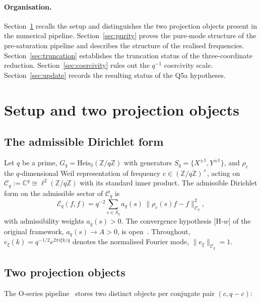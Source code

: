\documentclass[11pt,a4paper]{article}
\theoremstyle{plain}
\theoremstyle{definition}
\newcommand{\Z}{\mathbb{Z}}
\newcommand{\C}{\mathbb{C}}
\newcommand{\Heis}{\mathrm{Heis}_3}
\newcommand{\Eq}{\mathcal{E}_q}
\newcommand{\Cq}{\mathcal{C}_q}
\newcommand{\exi}[1]{e_{#1}}
\begin{document}
  \paragraph{Organisation.}
    Section~\ref{sec:setup} recalls the setup and distinguishes the two projection
    objects present in the numerical pipeline.
    Section~\ref{sec:purity} proves the pure-mode structure of the pre-saturation
    pipeline and describes the structure of the realised frequencies.
    Section~\ref{sec:truncation} establishes the truncation status of the
    three-coordinate reduction.
    Section~\ref{sec:coercivity} rules out the $q^{-1}$ coercivity scale.
    Section~\ref{sec:update} records the resulting status of the Q5a hypotheses.

  \section{Setup and two projection objects}
  \label{sec:setup}

  \subsection{The admissible Dirichlet form}

    Let $q$ be a prime, $G_q = \Heis(\Z/q\Z)$ with generators
    $S_q = \{X^{\pm 1}, Y^{\pm 1}\}$, and $\rho_c$ the $q$-dimensional Weil
    representation of frequency $c \in (\Z/q\Z)^\times$, acting on
    $\Cq := \C^q \cong \ell^2(\Z/q\Z)$ with its standard inner product.
    The admissible Dirichlet form on the admissible sector of $\Cq$ is
    \[
      \Eq(f,f) = q^{-2}\sum_{s \in S_q} a_q(s)\,\|\rho_c(s)f - f\|^2_{\Cq},
    \]
    with admissibility weights $a_q(s) > 0$.
    The convergence hypothesis [H-$w$] of the original framework, $a_q(s) \to A > 0$, is
    open~\cite{Beau2026w1}.
    Throughout, $\exi{\xi}(k) = q^{-1/2} e^{2\pi i \xi k/q}$ denotes the normalised
    Fourier mode, $\|\exi{\xi}\|_{\Cq} = 1$.

  \subsection{Two projection objects}
    \label{subsec:two-projections}

    The O-series pipeline~\cite{Beau2026a29} stores two distinct objects per
    conjugate pair $(c, q-c)$:
\end{document}
